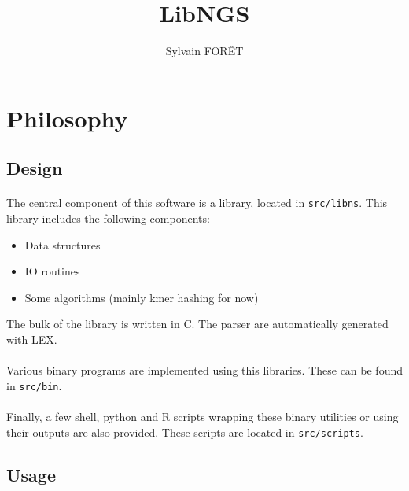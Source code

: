 \documentclass[a4paper,12pt]{article}
\title{LibNGS}
\author{Sylvain FOR\^ET}
\begin{document}
\maketitle

\newpage

\tableofcontents

\newpage

\section{Philosophy}

\subsection{Design}

\paragraph{}
The central component of this software is a library, located in
\texttt{src/libns}.
This library includes the following components:
\begin{itemize}
    \item Data structures
    \item IO routines
    \item Some algorithms (mainly kmer hashing for now)
\end{itemize}
The bulk of the library is written in C.
The parser are automatically generated with LEX.

\paragraph{}
Various binary programs are implemented using this libraries.
These can be found in \texttt{src/bin}.

\paragraph{}
Finally, a few shell, python and R scripts wrapping these binary utilities or
using their outputs are also provided.
These scripts are located in \texttt{src/scripts}.

\subsection{Usage}
\end{document}
